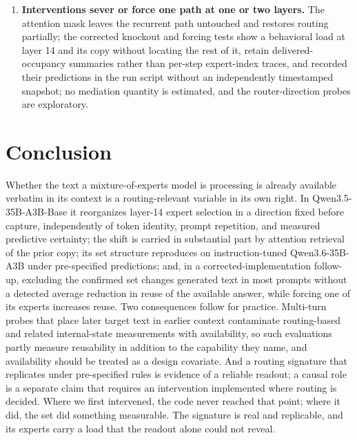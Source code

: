 \documentclass[10pt,a4paper,twocolumn]{article}
\begin{document}
\begin{enumerate}[leftmargin=1.4em,itemsep=2pt]
prompt sampling only. Layers 8 to 31 of this checkpoint come in twin pairs
at offset 12 (Section~\ref{sec:layers}), so layer 26 is not an independent
corroborating layer.
\item \textbf{Interventions sever or force one path at one or two layers.}
The attention mask leaves the recurrent path untouched and restores routing
partially; the corrected knockout and forcing tests show a behavioral load
at layer 14 and its copy without locating the rest of it, retain
delivered-occupancy summaries rather than per-step expert-index traces, and
recorded their predictions in the run script without an independently
timestamped snapshot; no mediation quantity is estimated, and the
router-direction probes are exploratory.
\end{enumerate}

\section{Conclusion}\label{sec:conclusion}

Whether the text a mixture-of-experts model is processing is already
available verbatim in its context is a routing-relevant variable in its own
right. In Qwen3.5-35B-A3B-Base it reorganizes layer-14 expert selection in a
direction fixed before capture, independently of token identity, prompt
repetition, and measured predictive certainty; the shift is carried in
substantial part by attention retrieval of the prior copy; its set structure
reproduces on instruction-tuned Qwen3.6-35B-A3B under pre-specified
predictions; and, in a corrected-implementation follow-up, excluding the
confirmed set changes generated text in most prompts without a detected
average reduction in reuse of the available answer, while forcing one of its experts
increases reuse. Two consequences follow for practice. Multi-turn probes
that place later target text in earlier context contaminate routing-based and
related internal-state measurements with availability, so such evaluations
partly measure reusability in addition to the capability they name, and
availability should be treated as a design covariate. And a routing
signature that replicates under pre-specified rules is evidence of a reliable
readout; a causal role is a separate claim that requires an intervention
implemented where routing is decided. Where we first intervened, the code
never reached that point; where it did, the set did something measurable.
The signature is real and replicable, and its experts carry a load that the
readout alone could not reveal.
\end{document}
